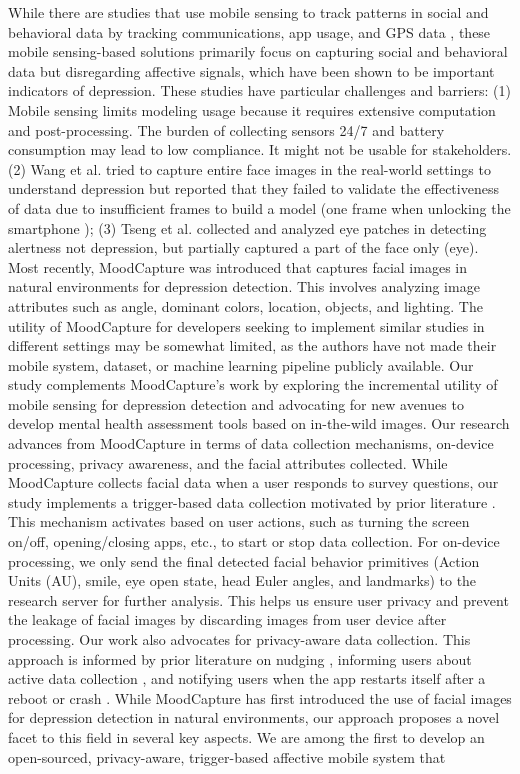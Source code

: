 While there are studies that use mobile sensing to track patterns in social and behavioral data by tracking communications, app usage, and GPS data \cite{wang2014studentlife, chikersal2021detecting, opoku2022mood}, these mobile sensing-based solutions primarily focus on capturing social and behavioral data but disregarding affective signals, which have been shown to be important indicators of depression. These studies have particular challenges and barriers: (1) Mobile sensing limits modeling usage because it requires extensive computation and post-processing. The burden of collecting sensors 24/7 and battery consumption may lead to low compliance. It might not be usable for stakeholders. (2) Wang et al. \cite{wang2015using} tried to capture entire face images in the real-world settings to understand depression but reported that they failed to validate the effectiveness of data due to insufficient frames to build a model (one frame when unlocking the smartphone ); (3) Tseng et al. collected and analyzed eye patches in detecting alertness \cite{tseng_alertnessscanner_2018} not depression, but partially captured a part of the face only (eye). Most recently, MoodCapture \cite{nepal2024moodcapture} was introduced that captures facial images in natural environments for depression detection. This involves analyzing image attributes such as angle, dominant colors, location, objects, and lighting. The utility of MoodCapture for developers seeking to implement similar studies in different settings may be somewhat limited, as the authors have not made their mobile system, dataset, or machine learning pipeline publicly available. Our study complements MoodCapture's work by exploring the incremental utility of mobile sensing for depression detection and advocating for new avenues to develop mental health assessment tools based on in-the-wild images. Our research advances from MoodCapture in terms of data collection mechanisms, on-device processing, privacy awareness, and the facial attributes collected. While MoodCapture collects facial data when a user responds to survey questions, our study implements a trigger-based data collection motivated by prior literature \cite{tseng2018alertnessscanner}. This mechanism activates based on user actions, such as turning the screen on/off, opening/closing apps, etc., to start or stop data collection. For on-device processing, we only send the final detected facial behavior primitives (Action Units (AU), smile, eye open state, head Euler angles, and landmarks) to the research server for further analysis. This helps us ensure user privacy and prevent the leakage of facial images by discarding images from user device after processing. Our work also advocates for privacy-aware data collection. This approach is informed by prior literature on nudging \cite{balebako2014improving}, informing users about active data collection \cite{felt2012ve, denning2014situ}, and notifying users when the app restarts itself after a reboot or crash \cite{denning2014situ}. While MoodCapture has first introduced the use of facial images for depression detection in natural environments, our approach proposes a novel facet to this field in several key aspects. We are among the first to develop an open-sourced, privacy-aware, trigger-based affective mobile system that 